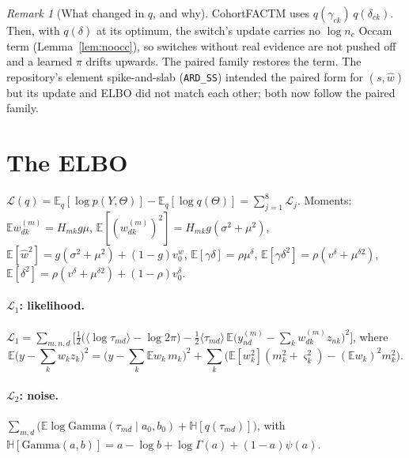 \documentclass[11pt,a4paper]{article}
\newcommand{\E}{\mathbb{E}}
\newcommand{\Gam}{\mathrm{Gamma}}
\newcommand{\ELBO}{\mathcal{L}}
\newcommand{\wh}{\hat w}
\theoremstyle{definition}
\theoremstyle{remark}
\newtheorem*{remark}{Remark}
\begin{document}
\begin{remark}[What changed in $q$, and why]
CohortFACTM uses $q(\gamma_{ck})\,q(\delta_{ck})$. Then, with $q(\delta)$ at its optimum, the switch's update carries no
$\log n_c$ Occam term (Lemma~\ref{lem:noocc}), so switches without real evidence are not pushed off and a learned $\pi$
drifts upwards. The paired family restores the term. The repository's element spike-and-slab (\texttt{ARD\_SS})
intended the paired form for $(s,\wh)$ but its update and ELBO did not match each other; both now follow the paired
family.
\end{remark}

\section{The ELBO}
$\ELBO(q)=\E_q[\log p(Y,\Theta)]-\E_q[\log q(\Theta)]=\sum_{j=1}^{8}\ELBO_j$. Moments:
$\E w^{(m)}_{dk}=H_{mk}g\mu$, $\E[(w^{(m)}_{dk})^2]=H_{mk}g(\sigma^2+\mu^2)$, $\E[\wh^2]=g(\sigma^2+\mu^2)+(1-g)v_0^w$,
$\E[\gamma\delta]=\rho\mu^\delta$, $\E[\gamma\delta^2]=\rho(v^\delta+\mu^{\delta2})$, $\E[\delta^2]=\rho(v^\delta+\mu^{\delta2})+(1-\rho)v_0^\delta$.

\paragraph{$\ELBO_1$: likelihood.}
$\displaystyle\ELBO_1=\sum_{m,n,d}\Big[\tfrac12\big(\langle\log\tau_{md}\rangle-\log2\pi\big)-\tfrac12\langle\tau_{md}\rangle\,
\E\Big(y^{(m)}_{nd}-\textstyle\sum_k w^{(m)}_{dk}z_{nk}\Big)^2\Big]$, where
\[
\E\Big(y-\textstyle\sum_k w_kz_k\Big)^2=\Big(y-\textstyle\sum_k\E w_k\,m_k\Big)^2+\textstyle\sum_k\big(\E[w_k^2](m_k^2+\varsigma_k^2)-(\E w_k)^2m_k^2\big).
\]

\paragraph{$\ELBO_2$: noise.} $\sum_{m,d}\big(\E\log\Gam(\tau_{md}\mid a_0,b_0)+\mathbb H[q(\tau_{md})]\big)$, with
$\mathbb H[\Gam(a,b)]=a-\log b+\log\Gamma(a)+(1-a)\psi(a)$.
\end{document}
